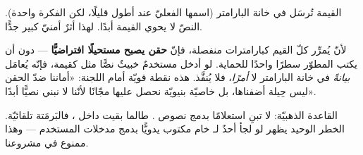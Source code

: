 \begin{center}\begin{LTR}
\end{LTR}\end{center}

القيمة  تُرسَل في خانة البارامتر  (اسمها الفعليّ عند
 أطول قليلًا، لكن الفكرة واحدة). النصّ لا يحوي القيمة أبدًا. لهذا أثرٌ أمنيّ
كبير جدًّا.

\begin{spotlight}
لأنّ  يُمرِّر كلّ القيم كبارامترات منفصلة، فإنّ \textbf{حقن 
 يصبح مستحيلًا افتراضيًّا} — دون أن يكتب المطوّر سطرًا واحدًا
للحماية. لو أدخل مستخدمٌ خبيثٌ نصًّا مثل  كقيمة، فإنّه يُعامَل
\emph{بيانةً} في خانة البارامتر لا \emph{أمرًا}، فلا يُنفَّذ. هذه نقطة قويّة أمام
اللجنة: «أماننا ضدّ الحقن ليس حِيلة أضفناها، بل خاصيّة بنيويّة نحصل عليها مجّانًا لأنّنا
لا نبني  نصيًّا أبدًا».
\end{spotlight}

\begin{secnote}
القاعدة الذهبيّة: لا تبنِ استعلامًا بدمج نصوص . طالما بقيت
داخل ، فالبَرمَتة تلقائيّة. الخطر الوحيد يظهر لو لجأ أحدٌ لـ  خام
مكتوب يدويًّا بدمج مدخلات المستخدم — وهذا ممنوع في مشروعنا.
\end{secnote}

